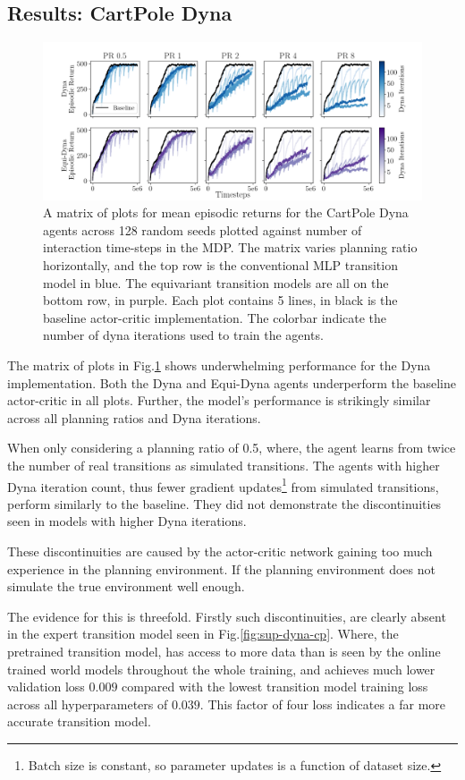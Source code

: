 \subsection{Results: CartPole Dyna}
\begin{figure}[h!]
	\centering
	\includegraphics[width=\textwidth]{Figures/dyna_sweep_cp.png}
	\caption{A matrix of plots for mean episodic returns for the CartPole Dyna agents across 128 random seeds
		plotted against number of interaction time-steps in the MDP. The matrix varies planning ratio horizontally, and the top row is the conventional MLP transition model in blue. The equivariant transition models are all on the bottom row, in purple. Each plot contains 5 lines, in black is the baseline actor-critic implementation. The colorbar indicate the number of dyna iterations used to train the agents.}
	\label{fig:cp_dyna}
\end{figure}

The matrix of plots in Fig.\ref{fig:cp_dyna} shows underwhelming performance for the Dyna implementation. Both the Dyna and Equi-Dyna agents underperform the baseline actor-critic in all plots. Further, the model's performance is strikingly similar across all planning ratios and Dyna iterations.

When only considering a planning ratio of 0.5, where, the agent learns from twice the number of real transitions as simulated transitions. The agents with higher Dyna iteration count, thus fewer gradient updates\footnote{Batch size is constant, so parameter updates is a function of dataset size.} from simulated transitions, perform similarly to the baseline. They did not demonstrate the discontinuities seen in models with higher Dyna iterations.

These discontinuities are caused by the actor-critic network gaining too much experience in the planning environment. If the planning environment does not simulate the true environment well enough.

The evidence for this is threefold. Firstly such discontinuities, are clearly absent in the expert transition model seen in Fig.\ref{fig:sup-dyna-cp}. Where, the pretrained transition model, has access to more data than is seen by the online trained world models throughout the whole training, and achieves much lower validation loss $0.009$ compared with the lowest transition model training loss across all hyperparameters of $0.039$. This factor of four loss indicates a far more accurate transition model.

